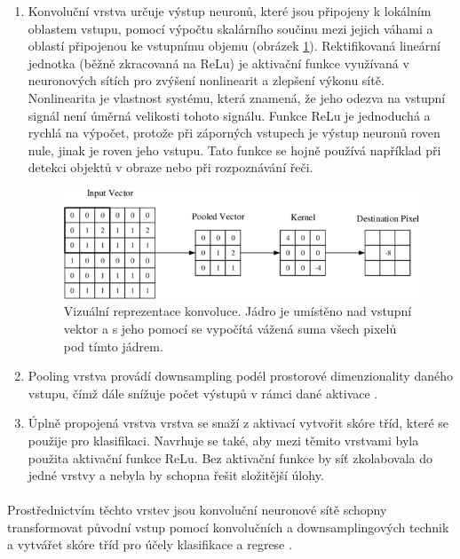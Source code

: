 \begin{enumerate}
    \item Konvoluční vrstva určuje výstup neuronů, které jsou připojeny k lokálním oblastem vstupu, pomocí výpočtu skalárního součinu mezi jejich váhami a oblastí připojenou ke vstupnímu objemu (obrázek \ref{conv}). Rektiﬁkovaná lineární jednotka (běžně zkracovaná na ReLu) \cite{relu} je aktivační funkce využívaná v neuronových sítích pro zvýšení nonlinearit a zlepšení výkonu sítě. Nonlinearita je vlastnost systému, která znamená, že jeho odezva na vstupní signál není úměrná velikosti tohoto signálu. Funkce ReLu je jednoduchá a rychlá na výpočet, protože při záporných vstupech je výstup neuronů roven nule, jinak je roven jeho vstupu. Tato funkce se hojně používá například při detekci objektů v obraze nebo při rozpoznávání řeči.  
\begin{figure}[ht]\centering
    \centering
    \includegraphics[width=0.6\linewidth]{obrazky-figures/convolution.png}
    \caption{Vizuální reprezentace konvoluce. Jádro je umístěno nad vstupní vektor a s jeho pomocí se vypočítá vážená suma všech pixelů pod tímto jádrem\protect\footnotemark{}.}
    \label{conv}
\end{figure}
\item Pooling vrstva provádí downsampling podél prostorové dimenzionality daného vstupu, čímž dále snížuje počet výstupů v rámci dané aktivace \cite{neural1}.
\item Úplně propojená vrstva vrstva se snaží z aktivací vytvořit skóre tříd, které se použije pro klasifikaci. Navrhuje se také, aby mezi těmito vrstvami byla použita aktivační funkce ReLu. Bez aktivační funkce by síť zkolabovala do jedné vrstvy a nebyla by schopna řešit složitější úlohy.
\end{enumerate}
\paragraph{}
Prostřednictvím těchto vrstev jsou konvoluční neuronové sítě schopny transformovat původní vstup pomocí konvolučních a downsamplingových technik a vytvářet skóre tříd pro účely klasifikace a regrese \cite{neural1}.

